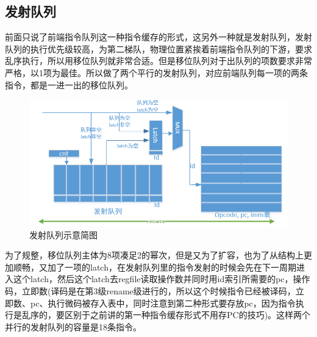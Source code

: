 \documentclass[11pt]{article}
\begin{document}
\subsection{发射队列}
前面只说了前端指令队列这一种指令缓存的形式，这另外一种就是发射队列，发射队列的执行优先级较高，为第二梯队，物理位置紧挨着前端指令队列的下游，要求乱序执行，所以用移位队列就非常合适。但是移位队列对于出队列的项数要求非常严格，以1项为最佳。所以做了两个平行的发射队列，对应前端队列每一项的两条指令，都是一进一出的移位队列。
\begin{figure}[H]
	\centering
	\includegraphics[width=0.7\linewidth]{figs/instqueue.png}
	\caption{发射队列示意简图}
\end{figure}
为了规整，移位队列主体为8项凑足2的幂次，但是又为了扩容，也为了从结构上更加顺畅，又加了一项的latch，在发射队列里的指令发射的时候会先在下一周期进入这个latch，然后这个latch去regfile读取操作数并同时用id索引所需要的pc，操作码，立即数(译码是在第3级rename级进行的，所以这个时候指令已经被译码，立即数、pc、执行微码被存入表中，同时注意到第二种形式要存放pc，因为指令执行是乱序的，要区别于之前讲的第一种指令缓存形式不用存PC的技巧)。这样两个并行的发射队列的容量是18条指令。
\end{document}
